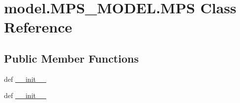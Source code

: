 \hypertarget{classmodel_1_1MPS__MODEL_1_1MPS}{}\section{model.\+M\+P\+S\+\_\+\+M\+O\+D\+E\+L.\+M\+P\+S Class Reference}
\label{classmodel_1_1MPS__MODEL_1_1MPS}
\subsection*{Public Member Functions}
\begin{DoxyCompactItemize}
\item 
def \hyperlink{classmodel_1_1MPS__MODEL_1_1MPS_a0ff78f4aab132a5723c33fe473f20a6c}{\+\_\+\+\_\+init\+\_\+\+\_\+}
\item 
def \hyperlink{classmodel_1_1MPS__MODEL_1_1MPS_a0ff78f4aab132a5723c33fe473f20a6c}{\+\_\+\+\_\+init\+\_\+\+\_\+}
\end{DoxyCompactItemize}
